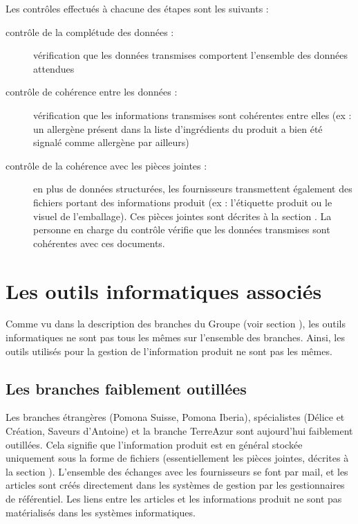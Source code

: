             Les contrôles effectués à chacune des étapes sont les suivants : 
            \begin{description}
                \item[contrôle de la complétude des données :] vérification que les données transmises comportent l'ensemble des données attendues
                \item[contrôle de cohérence entre les données :] vérification que les informations transmises sont cohérentes entre elles (ex : un allergène présent dans la liste d'ingrédients du produit a bien été signalé comme allergène par ailleurs)
                \item[contrôle de la cohérence avec les pièces jointes :] en plus de données structurées, les fournisseurs transmettent également des fichiers portant des informations produit (ex : l'étiquette produit ou le visuel de l'emballage). Ces pièces jointes sont décrites à la section . La personne en charge du contrôle vérifie que les données transmises sont cohérentes avec ces documents.
            \end{description}

        \section{Les outils informatiques associés}
        \label{outils_infos}

        Comme vu dans la description des branches du Groupe (voir section ), les outils informatiques ne sont pas tous les mêmes sur l'ensemble des branches.
        Ainsi, les outils utilisés pour la gestion de l'information produit ne sont pas les mêmes.

            \subsection{Les branches faiblement outillées}
            
            Les branches étrangères (Pomona Suisse, Pomona Iberia), spécialistes (Délice et Création, Saveurs d'Antoine) et la branche TerreAzur sont aujourd'hui faiblement outillées.
            Cela signifie que l'information produit est en général stockée uniquement sous la forme de fichiers (essentiellement les pièces jointes, décrites à la section ).
            L'ensemble des échanges avec les fournisseurs se font par mail, et les articles sont créés directement dans les systèmes de gestion par les gestionnaires de référentiel.
            Les liens entre les articles et les informations produit ne sont pas matérialisés dans les systèmes informatiques.

